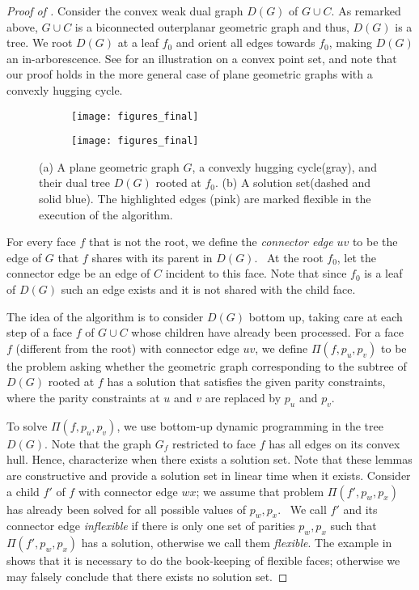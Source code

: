 \documentclass[a4paper,runningheads,cleveref,thm-restate]{lipics-v2021}
\newcommand{\hset}{solution set\xspace}
\newcommand{\invertible}{flexible\xspace}%
\newcommand{\noninvertible}{inflexible\xspace}%
\newcommand{\hug}{hugging cycle\xspace}
\begin{document}
\begin{proof}[Proof of ]
	{
	Consider the convex weak dual graph $D(G)$ of $G \cup C$. 
	As remarked above, $G \cup C$ is a biconnected outerplanar geometric graph and thus, $D(G)$ is a tree. 
	We root $D(G)$ at a leaf $f_0$ and orient all edges towards $f_0$, making $D(G)$ an in-arborescence. See  for an illustration on a convex point set, and note that our proof holds in the more general case of plane geometric graphs with a convexly hugging cycle.} 	
	\begin{figure}[htb]
		\centering
		\begin{subfigure}{.3\textwidth}
			\centering
			\texttt{[image: figures\_final]}
			\caption{}
			\label{fig:convexTreeA}
		\end{subfigure}\hfil
		\begin{subfigure}{.3\textwidth}
			\centering
			\texttt{[image: figures\_final]}
			\caption{}
			\label{fig:convexTreeB}
		\end{subfigure}
		\caption{(a) A plane geometric graph $G$, a convexly \hug (gray), and their dual tree $D(G)$ rooted at $f_0$. (b) A \hset (dashed and solid blue). The highlighted edges (pink) are marked \invertible in the execution of the algorithm.}
		\label{fig:convexTree}
	\end{figure}
%

For every face $f$ that is not the root, we define the \emph{connector edge} $uv$ to be the edge of $G$ that $f$ shares with its parent in $D(G)$.  
At the root $f_0$, let the connector edge be an edge of $C$ incident to this face. 
Note that since $f_0$ is a leaf of $D(G)$ such an edge exists and it is not shared with the child face.


	The idea of the algorithm is to consider $D(G)$ bottom up, taking care at each step of a face $f$ of $G\cup C$ whose children have already been processed. 
	For a face~$f$ (different from the root) with connector edge $uv$, 
	we define $\Pi(f,p_u,p_v)$ to be the problem asking whether the geometric graph corresponding to the subtree of $D(G)$ rooted at $f$ has a solution that satisfies the given parity constraints, where the parity constraints at $u$ and $v$ are replaced by $p_u$ and $p_v$.     

	
	To solve $\Pi(f,p_u,p_v)$, we use bottom-up dynamic programming in the tree $D(G)$. Note that the graph $G_f$ restricted to face $f$ has all edges on its convex hull. 
	Hence,  characterize when there exists a \hset. 
	Note that these lemmas are constructive and provide a \hset in linear time when it exists. 
	Consider a child $f'$ of $f$ with connector edge $wx$; 
	we assume that problem $\Pi(f',p_w,p_x)$ has already been solved for all possible values of $p_w,p_x$. 
	We call $f'$ and its connector edge \emph{\noninvertible} if there is only one set of parities $p_w,p_x$ such that $\Pi(f',p_w,p_x)$ has a solution, otherwise we call them \emph{\invertible}. 
	The example in  shows that it is necessary to do the book-keeping of \invertible faces; otherwise we may falsely conclude that there exists no \hset. 
	

\end{proof}
\end{document}
